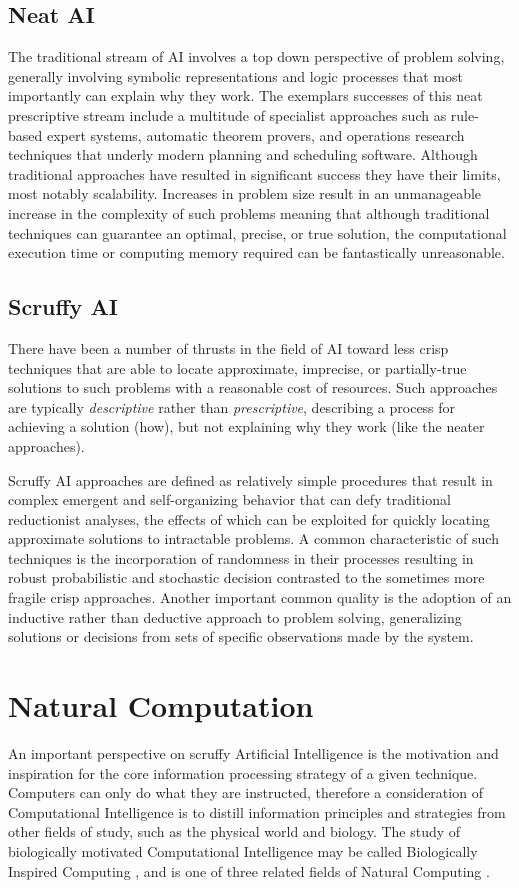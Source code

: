 \documentclass[a4paper, 11pt]{article}
\begin{document}
\subsection{Neat AI}
The traditional stream of AI involves a top down perspective of problem solving, generally involving symbolic representations and logic processes that most importantly can explain why they work. The exemplars successes of this neat prescriptive stream include a multitude of specialist approaches such as rule-based expert systems, automatic theorem provers, and operations research techniques that underly modern planning and scheduling software. Although traditional approaches have resulted in significant success they have their limits, most notably scalability. Increases in problem size result in an unmanageable increase in the complexity of such problems meaning that although traditional techniques can guarantee an optimal, precise, or true solution, the computational execution time or computing memory required can be fantastically unreasonable.

\subsection{Scruffy AI}
There have been a number of thrusts in the field of AI toward less crisp techniques that are able to locate approximate, imprecise, or partially-true solutions to such problems with a reasonable cost of resources. Such approaches are typically \emph{descriptive} rather than \emph{prescriptive}, describing a process for achieving a solution (how), but not explaining why they work (like the neater approaches). 

Scruffy AI approaches are defined as relatively simple procedures that result in complex emergent and self-organizing behavior that can defy traditional reductionist analyses, the effects of which can be exploited for quickly locating approximate solutions to intractable problems. A common characteristic of such techniques is the incorporation of randomness in their processes resulting in robust probabilistic and stochastic decision contrasted to the sometimes more fragile crisp approaches. Another important common quality is the adoption of an inductive rather than deductive approach to problem solving, generalizing solutions or decisions from sets of specific observations made by the system.

% 
% 
\section{Natural Computation}
\label{sec:natural_computation}
An important perspective on scruffy Artificial Intelligence is the motivation and inspiration for the core information processing strategy of a given technique. Computers can only do what they are instructed, therefore a consideration of Computational Intelligence is to distill information principles and strategies from other fields of study, such as the physical world and biology. The study of biologically motivated Computational Intelligence may be called Biologically Inspired Computing \cite{Castro2005a}, and is one of three related fields of Natural Computing \cite{Forbes2000, Forbes2005, Paton1994}. 
\end{document}
